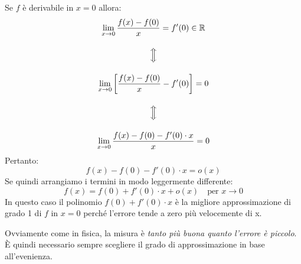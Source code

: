 Se $f$ è derivabile in $x = 0$ allora:
\begin{gather*}
	\lim_{x \to 0} \dfrac{f(x) - f(0)}{x} = f'(0) \in \mathbb{R}\\[10pt]
	\Big\Updownarrow\\[10pt]
	\lim_{x \to 0} \left[ \dfrac{f(x) - f(0)}{x} - f'(0)\right] = 0\\[10pt]
	\Big\Updownarrow\\[10pt]
	\lim_{x \to 0} \dfrac{f(x) - f(0) - f'(0) \cdot x}{x} = 0
\end{gather*}
Pertanto:
\begin{equation*}
	f(x) - f(0) - f'(0) \cdot x = o(x)
\end{equation*}
Se quindi arrangiamo i termini in modo leggermente differente:
\begin{equation*}
	f(x) = f(0) + f'(0) \cdot x + o(x) \quad \text{per } x \to 0
\end{equation*}
In questo caso il polinomio $f(0) + f'(0) \cdot x$ è la migliore 
approssimazione di grado 1 di $f$ in $x = 0$ perché l'errore tende a zero più 
velocemente di x.

Ovviamente come in fisica, la misura è \textit{tanto più buona quanto l'errore 
è piccolo}. È quindi necessario sempre scegliere il grado di approssimazione in 
base all'evenienza.

